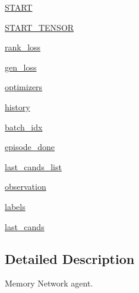 \begin{DoxyCompactItemize}
\item 
\hyperlink{classparlai_1_1agents_1_1legacy__agents_1_1memnn_1_1memnn__v0_1_1MemnnAgent_ad47aab7437ba9ae08a1cd0637de02f27}{S\+T\+A\+RT}
\item 
\hyperlink{classparlai_1_1agents_1_1legacy__agents_1_1memnn_1_1memnn__v0_1_1MemnnAgent_a7a1ae5fdf464724f1c696ea71f4e2593}{S\+T\+A\+R\+T\+\_\+\+T\+E\+N\+S\+OR}
\item 
\hyperlink{classparlai_1_1agents_1_1legacy__agents_1_1memnn_1_1memnn__v0_1_1MemnnAgent_a438cc6b1bc8e6443220b6d25a332f627}{rank\+\_\+loss}
\item 
\hyperlink{classparlai_1_1agents_1_1legacy__agents_1_1memnn_1_1memnn__v0_1_1MemnnAgent_a1679d276474a4ab8baa4d368fdee8c8b}{gen\+\_\+loss}
\item 
\hyperlink{classparlai_1_1agents_1_1legacy__agents_1_1memnn_1_1memnn__v0_1_1MemnnAgent_a442f9e9a53de9c0e91953371e11a2b5d}{optimizers}
\item 
\hyperlink{classparlai_1_1agents_1_1legacy__agents_1_1memnn_1_1memnn__v0_1_1MemnnAgent_a86ebdb3ff6941cfb15945a9f3f198f83}{history}
\item 
\hyperlink{classparlai_1_1agents_1_1legacy__agents_1_1memnn_1_1memnn__v0_1_1MemnnAgent_a760f59a2f18c3132341cfc6737365c1f}{batch\+\_\+idx}
\item 
\hyperlink{classparlai_1_1agents_1_1legacy__agents_1_1memnn_1_1memnn__v0_1_1MemnnAgent_a19eee67f8834043130a277fa35bbffc5}{episode\+\_\+done}
\item 
\hyperlink{classparlai_1_1agents_1_1legacy__agents_1_1memnn_1_1memnn__v0_1_1MemnnAgent_affeb8168155ac425e348c0ce599f1764}{last\+\_\+cands\+\_\+list}
\item 
\hyperlink{classparlai_1_1agents_1_1legacy__agents_1_1memnn_1_1memnn__v0_1_1MemnnAgent_afa839a741742c292916a7fce23c71a31}{observation}
\item 
\hyperlink{classparlai_1_1agents_1_1legacy__agents_1_1memnn_1_1memnn__v0_1_1MemnnAgent_a5d56f023807667a1e589833d3d5220df}{labels}
\item 
\hyperlink{classparlai_1_1agents_1_1legacy__agents_1_1memnn_1_1memnn__v0_1_1MemnnAgent_a2f76bf7b117ffc19e89b2b6168026063}{last\+\_\+cands}
\end{DoxyCompactItemize}


\subsection{Detailed Description}
\begin{DoxyVerb}Memory Network agent.\end{DoxyVerb}
 


